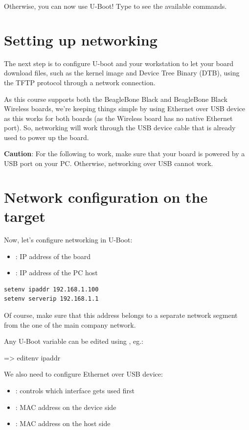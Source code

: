 Otherwise, you can now use U-Boot! Type  to see the available
commands.

\section{Setting up networking}

The next step is to configure U-boot and your workstation to let your
board download files, such as the kernel image and Device Tree Binary
(DTB), using the TFTP protocol through a network connection.

As this course supports both the BeagleBone Black and BeagleBone Black
Wireless boards, we're keeping things simple by using Ethernet over USB
device as this works for both boards (as the Wireless board has no
native Ethernet port). So, networking will work through the USB device
cable that is already used to power up the board.

{\bf Caution}: For the following to work, make sure that your board
is powered by a USB port on your PC. Otherwise, networking over USB
cannot work.

\section{Network configuration on the target}
Now, let's configure networking in U-Boot:

\begin{itemize}
  \item {}: IP address of the board
  \item {}: IP address of the PC host
\end{itemize}

\begin{verbatim}
setenv ipaddr 192.168.1.100
setenv serverip 192.168.1.1
\end{verbatim}

Of course, make sure that this address belongs to a separate network
segment from the one of the main company network.

Any U-Boot variable can be edited using , eg.:

\begin{ubootinput}
=> editenv ipaddr
\end{ubootinput}

We also need to configure Ethernet over USB device:
\begin{itemize}
  \item {}: controls which interface gets used first
  \item {}: MAC address on the device side
  \item {}: MAC address on the host side  
\end{itemize}


